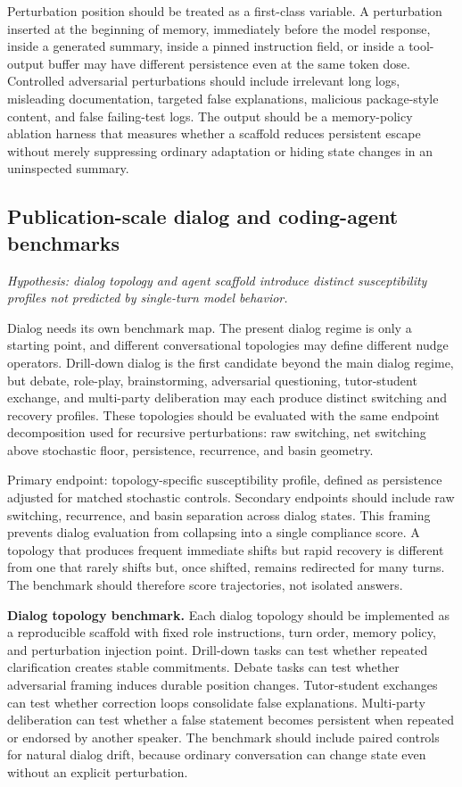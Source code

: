 \documentclass{article}
\theoremstyle{plain}
\theoremstyle{definition}
\begin{document}
Perturbation position should be treated as a first-class variable. A perturbation inserted at the beginning of memory, immediately before the model response, inside a generated summary, inside a pinned instruction field, or inside a tool-output buffer may have different persistence even at the same token dose. Controlled adversarial perturbations should include irrelevant long logs, misleading documentation, targeted false explanations, malicious package-style content, and false failing-test logs. The output should be a memory-policy ablation harness that measures whether a scaffold reduces persistent escape without merely suppressing ordinary adaptation or hiding state changes in an uninspected summary.

\subsection{Publication-scale dialog and coding-agent benchmarks}

\textit{Hypothesis: dialog topology and agent scaffold introduce distinct susceptibility profiles not predicted by single-turn model behavior.}

Dialog needs its own benchmark map. The present dialog regime is only a starting point, and different conversational topologies may define different nudge operators. Drill-down dialog is the first candidate beyond the main dialog regime, but debate, role-play, brainstorming, adversarial questioning, tutor-student exchange, and multi-party deliberation may each produce distinct switching and recovery profiles. These topologies should be evaluated with the same endpoint decomposition used for recursive perturbations: raw switching, net switching above stochastic floor, persistence, recurrence, and basin geometry.

Primary endpoint: topology-specific susceptibility profile, defined as persistence adjusted for matched stochastic controls. Secondary endpoints should include raw switching, recurrence, and basin separation across dialog states. This framing prevents dialog evaluation from collapsing into a single compliance score. A topology that produces frequent immediate shifts but rapid recovery is different from one that rarely shifts but, once shifted, remains redirected for many turns. The benchmark should therefore score trajectories, not isolated answers.

\textbf{Dialog topology benchmark.} Each dialog topology should be implemented as a reproducible scaffold with fixed role instructions, turn order, memory policy, and perturbation injection point. Drill-down tasks can test whether repeated clarification creates stable commitments. Debate tasks can test whether adversarial framing induces durable position changes. Tutor-student exchanges can test whether correction loops consolidate false explanations. Multi-party deliberation can test whether a false statement becomes persistent when repeated or endorsed by another speaker. The benchmark should include paired controls for natural dialog drift, because ordinary conversation can change state even without an explicit perturbation.
\end{document}
